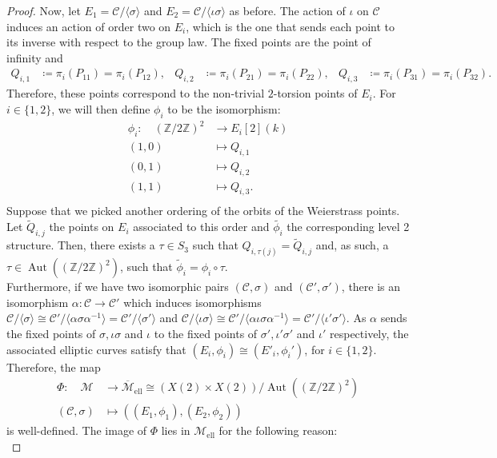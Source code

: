 \documentclass{amsart}
\newcommand{\calC}{\mathcal{C}}
\newcommand{\calM}{\mathcal{M}}
\DeclareMathOperator{\Aut}{Aut}
\newcommand{\mell}{\mathcal{M}_{\text{ell}}}
\newcommand{\mellc}{\overline{\mathcal{M}}_{\text{ell}}}
\numberwithin{equation}{section}
\theoremstyle{definition}
\theoremstyle{remark}
\begin{document}
\begin{proof}
Now, let $E_1=\calC/\langle\sigma\rangle$ and $E_2=\calC/\langle\iota\sigma\rangle$ as before. The action of $\iota$ on $\calC$ induces an action of order two on $E_i$, which  is the one that sends each point to its inverse with respect to the group law. The fixed points are the point of infinity and
\begin{align*}
Q_{i,1}&\coloneqq\pi_i(P_{11})=\pi_i(P_{12}), & Q_{i,2}&\coloneqq\pi_i(P_{21})=\pi_i(P_{22}), &
Q_{i,3}&\coloneqq\pi_i(P_{31})=\pi_i(P_{32}).
\end{align*}
Therefore, these points correspond to the non-trivial $2$-torsion points of $E_i$. For $i\in\{1,2\}$, we will then define $\phi_i$ to be the isomorphism:
\begin{align*}
\phi_i\colon\quad(\mathbb{Z}/2\mathbb{Z})^2&\longrightarrow E_i[2](k)\\
(1,0)&\longmapsto Q_{i,1}\\
(0,1)&\longmapsto Q_{i,2}\\
(1,1)&\longmapsto Q_{i,3}.\\
\end{align*}
Suppose that we picked another ordering of the orbits of the Weierstrass points. Let $\tilde{Q}_{i,j}$ the points on $E_i$ associated to this order and $\tilde{\phi_i}$ the corresponding level 2 structure. Then, there exists a $\tau\in S_3$ such that $Q_{i,\tau(j)}=\tilde{Q}_{i,j}$ and, as such, a $\tau\in \Aut((\mathbb{Z}/2\mathbb{Z})^2)$, such that $\tilde{\phi}_i=\phi_i\circ\tau$.\\

Furthermore, if we have two isomorphic pairs $(\calC,\sigma)$ and $(\calC',\sigma')$, there is an isomorphism $\alpha:\calC\rightarrow\calC'$ which induces isomorphisms $\calC/\langle\sigma\rangle\cong\calC'/\langle\alpha\sigma\alpha^{-1}\rangle=\calC'/\langle\sigma'\rangle$ and $\calC/\langle\iota\sigma\rangle\cong\calC'/\langle\alpha\iota\sigma\alpha^{-1}\rangle=\calC'/\langle\iota'\sigma'\rangle$. As $\alpha$ sends the fixed points of $\sigma, \iota\sigma$ and $\iota$ to the fixed points of $\sigma', \iota'\sigma'$ and $\iota'$ respectively, the associated elliptic curves satisfy that $(E_i,\phi_i)\cong(E'_i,\phi_i')$, for $i\in\{1,2\}$.\\

Therefore, the map
\begin{align*}
\Phi\colon\quad\calM&\longrightarrow\mellc\cong (X(2)\times X(2))/\Aut((\mathbb{Z}/2\mathbb{Z})^2)\\
(\calC,\sigma)&\longmapsto((E_1,\phi_1),(E_2,\phi_2))
\end{align*}
is well-defined. The image of $\Phi$ lies in $\mell$ for the following reason:\\


\end{proof}
\end{document}
